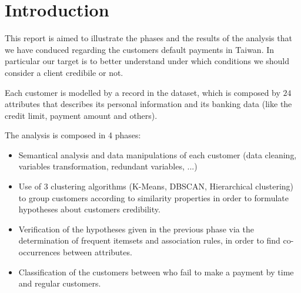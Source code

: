 \chapter{Introduction}


This report is aimed to illustrate the phases and the results of the analysis that we have conduced regarding the customers default payments in Taiwan. 
In particular our target is to better understand under which conditions we should consider a client credibile or not.
\smallskip

Each customer is modelled by a record in the dataset, which is composed by $24$ attributes that describes its personal information and its banking data (like the credit limit, payment amount and others).

The analysis is composed in 4 phases:

\begin{itemize}
  \item Semantical analysis and data manipulations of each customer (data cleaning, variables transformation, redundant variables, ...)
  \item Use of 3 clustering algorithms (K-Means, DBSCAN, Hierarchical clustering) to group customers according to similarity properties in order to formulate hypotheses about customers credibility.
  \item Verification of the hypotheses given in the previous phase via the determination of frequent itemsets and association rules, in order to find co-occurrences between attributes.
  \item Classification of the customers between who fail to make a payment by time and regular customers.
\end{itemize}

